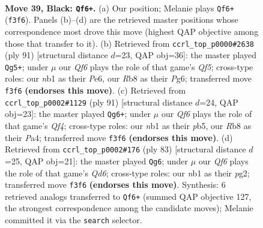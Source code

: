 \documentclass[11pt]{article}
\begin{document}
\clearpage

\begin{figure}[p]\centering
\begin{subfigure}{0.46\textwidth}\centering
\resizebox{\linewidth}{!}{%
\newchessgame
\chessboard[
  setfen={1r4k1/2p2p2/8/2Q5/2P1P1PK/5q2/8/1N6 b - - 1 39},
  showmover=false,
  pgfstyle=straightmove, color=movearrow, markmove={f3-f6}
]}
\caption{}
\end{subfigure}\hfill
\begin{subfigure}{0.46\textwidth}\centering
\resizebox{\linewidth}{!}{%
\newchessgame
\chessboard[
  setfen={8/4k3/1QP1p1p1/p7/P1P2q2/5P2/6K1/8 b - - 0 46},
  showmover=false,
  pgfstyle=straightmove, color=movearrow, markmove={f4-g5}
]}
\caption{}
\end{subfigure}
\\[4pt]
\begin{subfigure}{0.46\textwidth}\centering
\resizebox{\linewidth}{!}{%
\newchessgame
\chessboard[
  setfen={4k3/2Q3pp/8/1P3q2/p1P5/7P/5P2/6K1 b - - 0 46},
  showmover=false,
  pgfstyle=straightmove, color=movearrow, markmove={f5-g6}
]}
\caption{}
\end{subfigure}\hfill
\begin{subfigure}{0.46\textwidth}\centering
\resizebox{\linewidth}{!}{%
\newchessgame
\chessboard[
  setfen={6k1/4Q1p1/p7/8/8/P2q3P/6P1/7K b - - 12 42},
  showmover=false,
  pgfstyle=straightmove, color=movearrow, markmove={d3-g6}
]}
\caption{}
\end{subfigure}
\caption{\textbf{Move 39, Black: \texttt{Qf6+}.} (a) Our position; Melanie plays \texttt{Qf6+} (\texttt{f3f6}). Panels (b)--(d) are the retrieved master positions whose correspondence most drove this move (highest QAP objective among those that transfer to it). (b) Retrieved from \texttt{ccrl\_top\_p0000\#2638} (ply 91) [structural distance $d$=23, QAP obj=36]: the master played \texttt{Qg5+}; under $\mu$ our \emph{Qf6} plays the role of that game's \emph{Qf5}; cross-type roles: our \emph{n}b1 as their \emph{P}e6, our \emph{R}b8 as their \emph{P}g6; transferred move \texttt{f3f6} \textbf{(endorses this move)}. (c) Retrieved from \texttt{ccrl\_top\_p0002\#1129} (ply 91) [structural distance $d$=24, QAP obj=23]: the master played \texttt{Qg6+}; under $\mu$ our \emph{Qf6} plays the role of that game's \emph{Qf4}; cross-type roles: our \emph{n}b1 as their \emph{p}b5, our \emph{R}b8 as their \emph{P}a4; transferred move \texttt{f3f6} \textbf{(endorses this move)}. (d) Retrieved from \texttt{ccrl\_top\_p0002\#176} (ply 83) [structural distance $d$=25, QAP obj=21]: the master played \texttt{Qg6}; under $\mu$ our \emph{Qf6} plays the role of that game's \emph{Qd6}; cross-type roles: our \emph{n}b1 as their \emph{p}g2; transferred move \texttt{f3f6} \textbf{(endorses this move)}. Synthesis: 6 retrieved analogs transferred to \texttt{Qf6+} (summed QAP objective 127, the strongest correspondence among the candidate moves); Melanie committed it via the \texttt{search} selector.}
\label{fig:thought-m77}
\end{figure}
\end{document}
